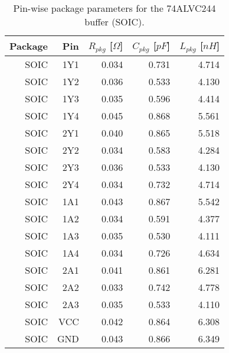 \documentclass[../main.tex]{subfiles}
\begin{document}
\begin{table}[h]
    \centering
    \begin{tabular}{r|r r r r}
        \toprule[1pt]
        \textbf{Package} & \textbf{Pin} & $R_{pkg}$ [$\si{\Omega}$] & $C_{pkg}$ [$\si{pF}$] & $L_{pkg}$ [$\si{nH}$] \\
        \midrule
        SOIC  & 1Y1  & 0.034 & 0.731 & 4.714 \\
        SOIC  & 1Y2  & 0.036 & 0.533 & 4.130 \\
        SOIC  & 1Y3  & 0.035 & 0.596 & 4.414 \\
        SOIC  & 1Y4  & 0.045 & 0.868 & 5.561 \\
        SOIC  & 2Y1  & 0.040 & 0.865 & 5.518 \\
        SOIC  & 2Y2  & 0.034 & 0.583 & 4.284 \\
        SOIC  & 2Y3  & 0.036 & 0.533 & 4.130 \\
        SOIC  & 2Y4  & 0.034 & 0.732 & 4.714 \\
        \midrule
        SOIC  & 1A1  & 0.043 & 0.867 & 5.542 \\
        SOIC  & 1A2  & 0.034 & 0.591 & 4.377 \\
        SOIC  & 1A3  & 0.035 & 0.530 & 4.111 \\
        SOIC  & 1A4  & 0.034 & 0.726 & 4.634 \\
        SOIC  & 2A1  & 0.041 & 0.861 & 6.281 \\
        SOIC  & 2A2  & 0.033 & 0.742 & 4.778 \\
        SOIC  & 2A3  & 0.035 & 0.533 & 4.110 \\
        SOIC  & VCC  & 0.042 & 0.864 & 6.308 \\
        SOIC  & GND  & 0.043 & 0.866 & 6.349 \\
        \bottomrule[1pt]
    \end{tabular}
    \caption{Pin-wise package parameters for the 74ALVC244 buffer (SOIC).}
\end{table}
\end{document}
